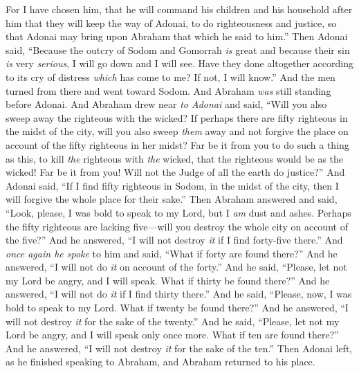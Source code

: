 \begin{biblechapter}
\verse For I have chosen him, that he will command his children and his household after him that they will keep the way of Adonai, to do righteousness and justice, so that Adonai may bring upon Abraham that which he said to him.”
\verse Then Adonai said, “Because the outcry of Sodom and Gomorrah \textit{is} great and because their sin \textit{is} very \textit{serious},
\verse I will go down and I will see. Have they done altogether according to its cry of distress \textit{which} has come to me? If not, I will know.”
 And the men turned from there and went toward Sodom. And Abraham \textit{was} still standing before Adonai.
\verse And Abraham drew near \textit{to Adonai} and said, “Will you also sweep away the righteous with the wicked?
\verse If perhaps there are fifty righteous in the midst of the city, will you also sweep \textit{them} away and not forgive the place on account of the fifty righteous in her midst?
\verse Far be it from you to do such a thing as this, to kill \textit{the} righteous with \textit{the} wicked, that the righteous would be as the wicked! Far be it from you! Will not the Judge of all the earth do justice?”
\verse And Adonai said, “If I find fifty righteous in Sodom, in the midst of the city, then I will forgive the whole place for their sake.”
\verse Then Abraham answered and said, “Look, please, I was bold to speak to my Lord, but I \textit{am} dust and ashes.
\verse Perhaps the fifty righteous are lacking five—will you destroy the whole city on account of the five?” And he answered, “I will not destroy \textit{it} if I find forty-five there.”
\verse And \textit{once again he spoke} to him and said, “What if forty are found there?” And he answered, “I will not do \textit{it} on account of the forty.”
\verse And he said, “Please, let not my Lord be angry, and I will speak. What if thirty be found there?” And he answered, “I will not do \textit{it} if I find thirty there.”
\verse And he said, “Please, now, I was bold to speak to my Lord. What if twenty be found there?” And he answered, “I will not destroy \textit{it} for the sake of the twenty.”
\verse And he said, “Please, let not my Lord be angry, and I will speak only once more. What if ten are found there?” And he answered, “I will not destroy \textit{it} for the sake of the ten.”
\verse Then Adonai left, as he finished speaking to Abraham, and Abraham returned to his place.
\end{biblechapter}


